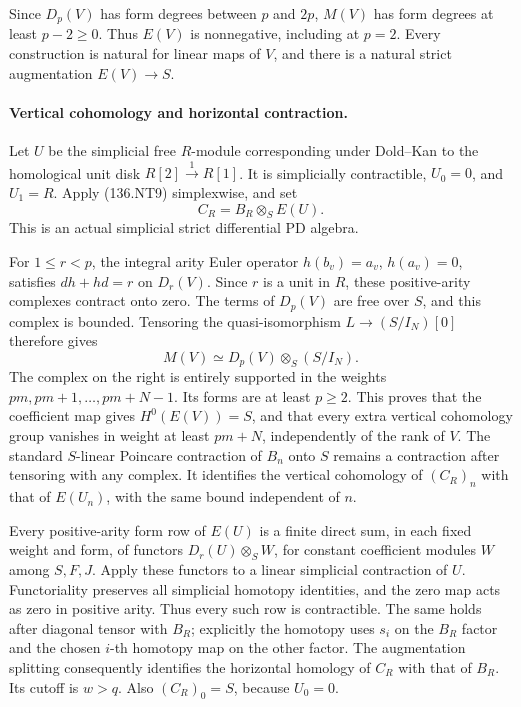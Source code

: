 Since \(D_p(V)\) has form degrees between \(p\) and \(2p\),
\(M(V)\) has form degrees at least \(p-2\geq0\).
Thus \(E(V)\) is nonnegative, including at \(p=2\).
Every construction is natural for linear maps of \(V\), and
there is a natural strict augmentation \(E(V)\to S\).

\paragraph{Vertical cohomology and horizontal contraction.}
Let \(U\) be the simplicial free \(R\)-module corresponding
under Dold--Kan to the homological unit disk
\(R[2]\xrightarrow{1}R[1]\). It is simplicially contractible,
\(U_0=0\), and \(U_1=R\). Apply (136.NT9) simplexwise, and set
\[
                 C_R=B_R\otimes_S E(U).                \tag{136.NT10}
\]
This is an actual simplicial strict differential PD algebra.

For \(1\leq r<p\), the integral arity Euler operator
\(h(b_v)=a_v\), \(h(a_v)=0\), satisfies
\(dh+hd=r\) on \(D_r(V)\). Since \(r\) is a unit in \(R\),
these positive-arity complexes contract onto zero.
The terms of \(D_p(V)\) are free over \(S\), and this complex
is bounded. Tensoring the quasi-isomorphism
\(L\to(S/I_N)[0]\) therefore gives
\[
       M(V)\simeq D_p(V)\otimes_S(S/I_N).               \tag{136.NT11}
\]
The complex on the right is entirely supported in the weights
\(pm,pm+1,\ldots,pm+N-1\). Its forms are at least \(p\geq2\).
This proves that the coefficient map gives \(H^0(E(V))=S\),
and that every extra vertical cohomology group vanishes in
weight at least \(pm+N\), independently of the rank of \(V\).
The standard \(S\)-linear Poincare contraction of \(B_n\)
onto \(S\) remains a contraction after tensoring with any
complex. It identifies the vertical cohomology of \((C_R)_n\)
with that of \(E(U_n)\), with the same bound independent of \(n\).

Every positive-arity form row of \(E(U)\) is a finite direct
sum, in each fixed weight and form, of functors
\(D_r(U)\otimes_S W\), for constant coefficient modules
\(W\) among \(S,F,J\). Apply these functors to a linear
simplicial contraction of \(U\). Functoriality preserves all
simplicial homotopy identities, and the zero map acts as zero
in positive arity. Thus every such row is contractible.
The same holds after diagonal tensor with \(B_R\); explicitly
the homotopy uses \(s_i\) on the \(B_R\) factor and the
chosen \(i\)-th homotopy map on the other factor.
The augmentation splitting consequently identifies the horizontal
homology of \(C_R\) with that of \(B_R\). Its cutoff is
\(w>q\). Also \((C_R)_0=S\), because \(U_0=0\).

